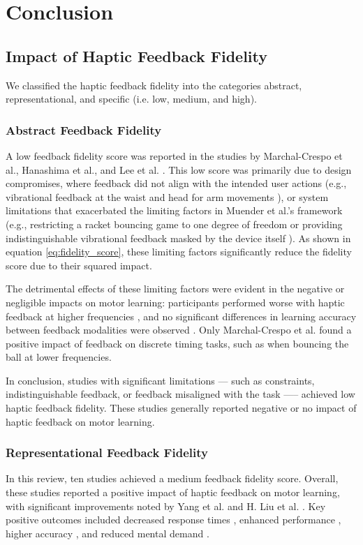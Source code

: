 \section{Conclusion}

\subsection{Impact of Haptic Feedback Fidelity}
We classified the haptic feedback fidelity into the categories abstract, representational, and specific (i.e. low, medium, and high).

\subsubsection{Abstract Feedback Fidelity}
A low feedback fidelity score was reported in the studies by Marchal-Crespo et al., Hanashima et al., and Lee et al. \cite{Marchal-Crespo2009ReviewInjury, Hanashima2023, Lee2012}. This low score was primarily due to design compromises, where feedback did not align with the intended user actions (e.g., vibrational feedback at the waist and head for arm movements \cite{Hanashima2023}), or system limitations that exacerbated the limiting factors in Muender et al.'s framework \cite{Muender2022HapticReality} (e.g., restricting a racket bouncing game to one degree of freedom \cite{Marchal-Crespo2009ReviewInjury} or providing indistinguishable vibrational feedback masked by the device itself \cite{Lee2012}). As shown in equation \ref{eq:fidelity_score}, these limiting factors significantly reduce the fidelity score due to their squared impact.

The detrimental effects of these limiting factors were evident in the negative or negligible impacts on motor learning: participants performed worse with haptic feedback at higher frequencies \cite{Lee2012, Marchal-Crespo2009ReviewInjury}, and no significant differences in learning accuracy between feedback modalities were observed \cite{Hanashima2023}. Only Marchal-Crespo et al. found a positive impact of feedback on discrete timing tasks, such as when bouncing the ball at lower frequencies.

In conclusion, studies with significant limitations --- such as constraints, indistinguishable feedback, or feedback misaligned with the task —-- achieved low haptic feedback fidelity. These studies generally reported negative or no impact of haptic feedback on motor learning.

\subsubsection{Representational Feedback Fidelity}
In this review, ten studies achieved a medium feedback fidelity score. Overall, these studies reported a positive impact of haptic feedback on motor learning, with significant improvements noted by Yang et al. and H. Liu et al. \cite{Yang2023, LiuH2019}. Key positive outcomes included decreased response times \cite{Najdovski2020}, enhanced performance \cite{Chappell2022}, higher accuracy \cite{Perez2023}, and reduced mental demand \cite{Yang2023, Manivannan2008}. 

